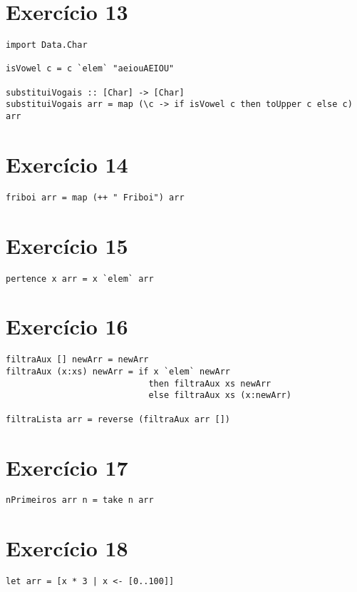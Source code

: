\documentclass[12pt,a4paper,brazil]{article}
\begin{document}
\section*{Exercício 13}
\begin{lstlisting}
import Data.Char

isVowel c = c `elem` "aeiouAEIOU"

substituiVogais :: [Char] -> [Char]
substituiVogais arr = map (\c -> if isVowel c then toUpper c else c) arr
\end{lstlisting}

\section*{Exercício 14}
\begin{lstlisting}
friboi arr = map (++ " Friboi") arr
\end{lstlisting}

\section*{Exercício 15}
\begin{lstlisting}
pertence x arr = x `elem` arr
\end{lstlisting}

\section*{Exercício 16}
\begin{lstlisting}
filtraAux [] newArr = newArr
filtraAux (x:xs) newArr = if x `elem` newArr
                            then filtraAux xs newArr
                            else filtraAux xs (x:newArr)

filtraLista arr = reverse (filtraAux arr [])
\end{lstlisting}

\section*{Exercício 17}
\begin{lstlisting}
nPrimeiros arr n = take n arr
\end{lstlisting}

\section*{Exercício 18}
\begin{lstlisting}
let arr = [x * 3 | x <- [0..100]]
\end{lstlisting}
\end{document}
